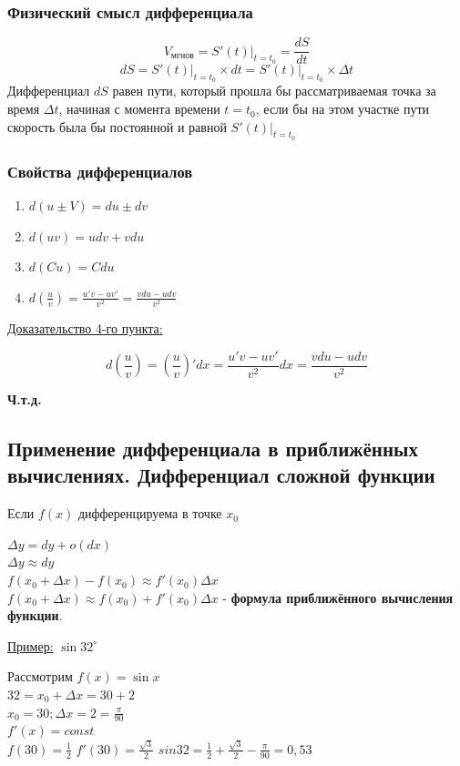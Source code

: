 \documentclass[12pt]{article}
\begin{document}
    \subsubsection*{Физический смысл дифференциала}
    \[V_{\text{мгнов}}=S'(t)\Big|_{t=t_0}=\frac{dS}{dt}\]
    \[ dS = S'(t)\Big|_{t=t_0} \times dt = S'(t)\Big|_{t=t_0} \times \Delta t \]
    Дифференциал $dS$ равен пути, который прошла бы рассматриваемая точка за время $\Delta t$, начиная с момента времени $t=t_0$, если бы на этом участке пути скорость была бы постоянной и равной $S'(t)\Big|_{t=t_0}$
    \subsubsection*{Свойства дифференциалов}
    \begin{enumerate}
        \item $d(u \pm V)=du \pm dv$
        \item $d(uv)=udv+vdu$
        \item $d(Cu)=Cdu$
        \item $d(\frac{u}{v})=\frac{u'v-uv'}{v^2}=\frac{vdu-udv}{v^2}$
    \end{enumerate} 
    \underline{Доказательство 4-го пункта:}
    \begin{adjustwidth}{1.5em}{1.5em}
        \[d\left(\frac{u}{v}\right)=\left(\frac{u}{v}\right)'dx=\frac{u'v-uv'}{v^2}dx=\frac{vdu-udv}{v^2}\]
        \begin{center}
            \textbf{Ч.т.д.}
        \end{center}
    \end{adjustwidth}
    \subsection{Применение дифференциала в приближённых вычислениях. Дифференциал сложной функции}
    \noindent Если $f(x)$ дифференцируема в точке $x_0$
    \begin{adjustwidth}{1.5em}{1.5em}
        $\Delta y=dy+o(dx)$\\
        $\Delta y \approx dy$\\
        $f(x_0+\Delta x)-f(x_0) \approx f'(x_0) \Delta x$\\
        $f(x_0+\Delta x) \approx f(x_0)+f'(x_0) \Delta x$ - \textbf{формула приближённого вычисления функции}.
    \end{adjustwidth}
    \underline{Пример:} $\sin 32^\circ$
    \begin{adjustwidth}{1.5em}{1.5em}
        Рассмотрим $f(x)=\sin x$\\
        $32 = x_0+\Delta x=30 + 2$\\
        $x_0=30;\Delta x = 2 = \frac{\pi}{90}$\\
        $f'(x)=const$\\
        $f(30)=\frac{1}{2}$
        $f'(30)=\frac{\sqrt{3}}{2}$
        $sin 32 = \frac{1}{2}+\frac{\sqrt{3}}{2}-\frac{\pi}{90}=0,53$    
    \end{adjustwidth}
\end{document}
